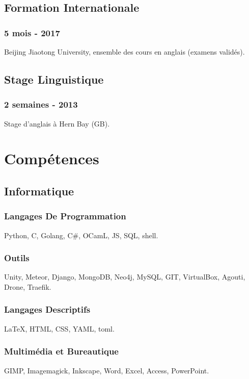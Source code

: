 \documentclass{article}
\begin{document}
\begin{multicols}{2}
            \subsection{Formation Internationale}
                \subsubsection{5 mois - 2017}
                    Beijing Jiaotong University, ensemble des cours en anglais (examens valid\'es).
            \subsection{Stage Linguistique}
                \subsubsection{2 semaines - 2013}
                    Stage d'anglais \`a Hern Bay (GB).

        \columnbreak

        \section{Comp\'etences}
            \subsection{Informatique}
                \subsubsection{Langages De Programmation}
                    Python, C, Golang, C\#, OCamL, JS, SQL, shell.
                \subsubsection{Outils}
                    Unity, Meteor, Django,  MongoDB, Neo4j, MySQL, GIT, VirtualBox, Agouti, Drone, Traefik.
                \subsubsection{Langages Descriptifs}
                    {\LaTeX}, HTML, CSS, YAML, toml.
                \subsubsection{Multim\'edia et Bureautique}
                    GIMP, Imagemagick, Inkscape, Word, Excel, Access, PowerPoint.

\end{multicols}
\end{document}
